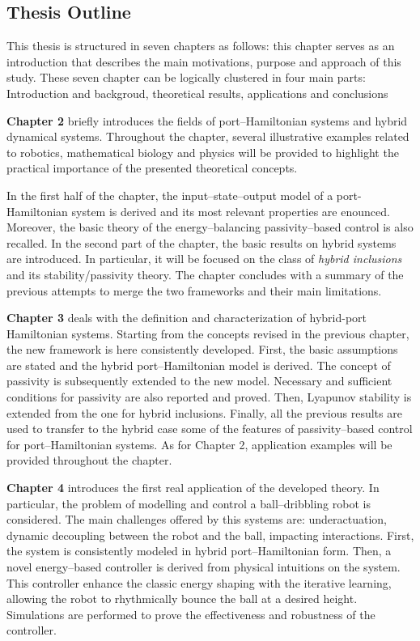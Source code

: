 \subsection{Thesis Outline}
This thesis is structured in seven chapters as follows: this chapter serves as an introduction that describes the main motivations, purpose and approach of this study.
These seven chapter can be logically clustered in four main parts: Introduction and backgroud, theoretical results, applications and conclusions  
%
\newline

%
\textbf{Chapter 2} briefly introduces the fields of port--Hamiltonian systems and hybrid dynamical systems. Throughout the chapter, several illustrative examples related to robotics, mathematical biology and physics will be provided to highlight the practical importance of the presented theoretical concepts. 

In the first half of the chapter, the input--state--output model of a port-Hamiltonian system is derived and its most relevant properties are enounced. Moreover, the basic theory of the energy--balancing passivity--based control is also recalled. In the second part of the chapter, the basic results on hybrid systems are introduced. In particular, it will be focused on the class of \textit{hybrid inclusions} and its stability/passivity theory.  The chapter concludes with a summary of the previous attempts to merge the two frameworks and their main limitations. 
%
\newline

%
\textbf{Chapter 3} deals with the definition and characterization of hybrid-port Hamiltonian systems. Starting from the concepts revised in the previous chapter, the new framework is here consistently developed. First, the basic assumptions are stated and the hybrid port--Hamiltonian model is derived. The concept of passivity is subsequently extended to the new model. Necessary and sufficient conditions for passivity are also reported and proved. Then, Lyapunov stability is extended from the one for hybrid inclusions. Finally, all the previous results are used to transfer to the hybrid case some of the features of passivity--based control for port--Hamiltonian systems. As for Chapter 2, application examples will be provided throughout the chapter.
%
\newline

%
\textbf{Chapter 4} introduces the first real application of the developed theory. In particular, the problem of modelling and control a ball--dribbling robot is considered. The main challenges offered by this systems are: underactuation, dynamic decoupling between the robot and the ball, impacting interactions. First, the system is consistently modeled in hybrid port--Hamiltonian form. Then, a novel energy--based controller is derived from physical intuitions on the system. This controller enhance the classic energy shaping with the iterative learning, allowing the robot to rhythmically bounce the ball at a desired height. Simulations are performed to prove the effectiveness and robustness of the controller.   
%
\newline

